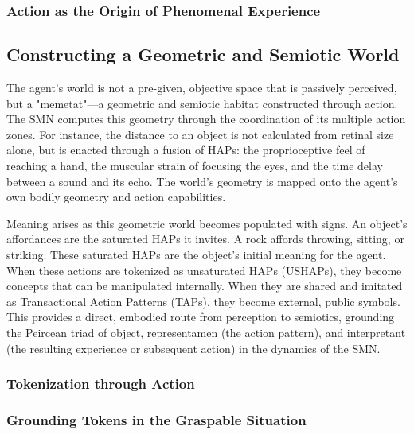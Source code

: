 \documentclass[10pt,letterpaper]{article}
\begin{document}
\subsubsection*{Action as the Origin of Phenomenal Experience}

\subsection*{Constructing a Geometric and Semiotic World}
The agent's world is not a pre-given, objective space that is passively perceived, but a "memetat"—a geometric and semiotic habitat constructed through action. The SMN computes this geometry through the coordination of its multiple action zones. For instance, the distance to an object is not calculated from retinal size alone, but is enacted through a fusion of HAPs: the proprioceptive feel of reaching a hand, the muscular strain of focusing the eyes, and the time delay between a sound and its echo. The world's geometry is mapped onto the agent's own bodily geometry and action capabilities.

Meaning arises as this geometric world becomes populated with signs. An object's affordances are the saturated HAPs it invites. A rock affords throwing, sitting, or striking. These saturated HAPs are the object's initial meaning for the agent. When these actions are tokenized as unsaturated HAPs (USHAPs), they become concepts that can be manipulated internally. When they are shared and imitated as Transactional Action Patterns (TAPs), they become external, public symbols. This provides a direct, embodied route from perception to semiotics, grounding the Peircean triad of object, representamen (the action pattern), and interpretant (the resulting experience or subsequent action) in the dynamics of the SMN.

\subsubsection*{Tokenization through Action}

\subsubsection*{Grounding Tokens in the Graspable Situation}
\end{document}
